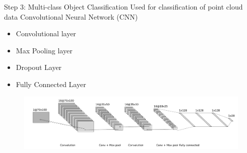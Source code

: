 \documentclass[9pt]{beamer}
\begin{document}
\begin{frame}[fragile]{Step 3: Multi-class Object Classification}
	Used for classification of point cloud data Convolutional Neural Network (CNN)

	\begin{itemize}
		\item Convolutional layer
		\item Max Pooling layer
		\item Dropout Layer
		\item Fully Connected Layer
	\end{itemize}

	\begin{figure}
		\centering
		\includegraphics[width=\textwidth]{images/object_net.pdf}

	\end{figure}
\end{frame}

\end{document}
